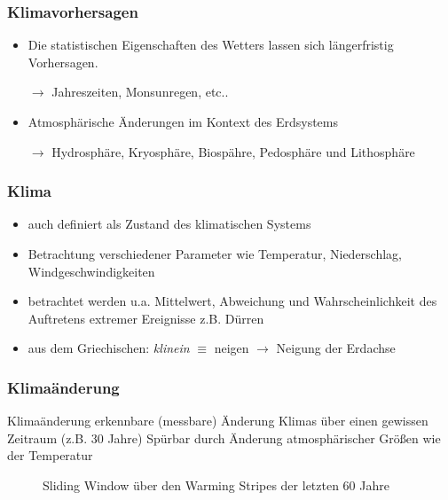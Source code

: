 \begin{frame}
	\frametitle{Klimavorhersagen}
	\begin{itemize}
		\item Die statistischen Eigenschaften des Wetters lassen sich längerfristig Vorhersagen.
		\item[$\rightarrow$] Jahreszeiten, Monsunregen, etc.. %
		\item Atmosphärische Änderungen im Kontext des Erdsystems
		\item [$\rightarrow$] Hydrosphäre, Kryosphäre, Biospähre, Pedosphäre und Lithosphäre %
	\end{itemize}
	
\end{frame}


\begin{frame}
	\frametitle{Klima}
	\begin{itemize}
		\item auch definiert als Zustand des klimatischen Systems %
		\item Betrachtung verschiedener Parameter wie Temperatur, Niederschlag, Windgeschwindigkeiten %
		\item betrachtet werden u.a. Mittelwert, Abweichung und Wahrscheinlichkeit des Auftretens extremer Ereignisse z.B. Dürren %
		\item aus dem Griechischen: \textit{klinein} $\equiv$ neigen $\rightarrow$ Neigung der Erdachse
	\end{itemize}
	
\end{frame}

\begin{frame}
	\frametitle{Klimaänderung}
	\begin{block}{Klimaänderung}		
		erkennbare (messbare) Änderung Klimas über einen gewissen Zeitraum (z.B. 30 Jahre) %
		Spürbar durch Änderung atmosphärischer Größen wie der Temperatur
	\end{block}
	
	
	\begin{figure}
		\caption{Sliding Window über den Warming Stripes der letzten 60 Jahre}
	\end{figure}
	
\end{frame}

